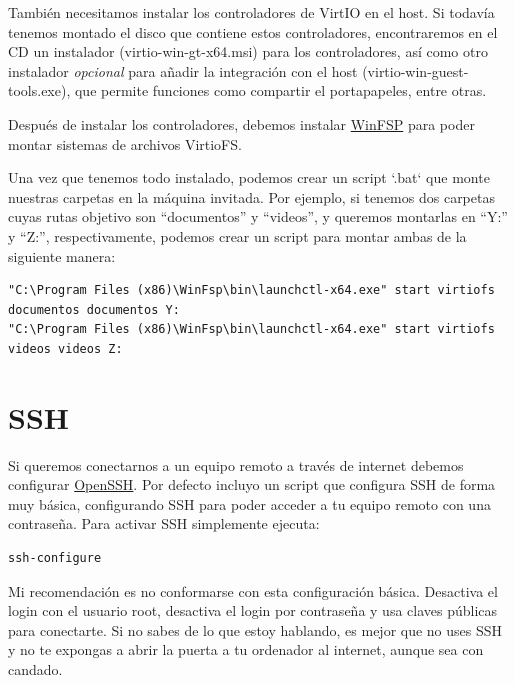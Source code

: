 \documentclass[11pt]{article}
\begin{document}
\vspace{5pt}

También necesitamos instalar los controladores de VirtIO en el host. Si todavía tenemos montado el disco que contiene estos controladores, encontraremos en el CD un instalador (virtio-win-gt-x64.msi) para los controladores, así como otro instalador \emph{opcional} para añadir la integración con el host (virtio-win-guest-tools.exe), que permite funciones como compartir el portapapeles, entre otras.

\vspace{5pt}

Después de instalar los controladores, debemos instalar \href{https://github.com/winfsp/winfsp}{WinFSP} para poder montar sistemas de archivos VirtioFS.

\vspace{5pt}

Una vez que tenemos todo instalado, podemos crear un script `.bat` que monte nuestras carpetas en la máquina invitada. Por ejemplo, si tenemos dos carpetas cuyas rutas objetivo son ``documentos'' y ``videos'', y queremos montarlas en ``Y:'' y ``Z:'', respectivamente, podemos crear un script para montar ambas de la siguiente manera:

\vspace{5pt}

\begin{lstlisting}[basicstyle=\scriptsize\ttfamily]
"C:\Program Files (x86)\WinFsp\bin\launchctl-x64.exe" start virtiofs documentos documentos Y:
"C:\Program Files (x86)\WinFsp\bin\launchctl-x64.exe" start virtiofs videos videos Z:
\end{lstlisting}

\section{SSH}

Si queremos conectarnos a un equipo remoto a través de internet debemos configurar \href{https://es.wikipedia.org/wiki/OpenSSH}{OpenSSH}. Por defecto incluyo un script que configura SSH de forma muy básica, configurando SSH para poder acceder a tu equipo remoto con una contraseña. Para activar SSH simplemente ejecuta:

\begin{verbatim}
ssh-configure
\end{verbatim}

Mi recomendación es no conformarse con esta configuración básica. Desactiva el login con el usuario root, desactiva el login por contraseña y usa claves públicas para conectarte. Si no sabes de lo que estoy hablando, es mejor que no uses SSH y no te expongas a abrir la puerta a tu ordenador al internet, aunque sea con candado.
\end{document}
